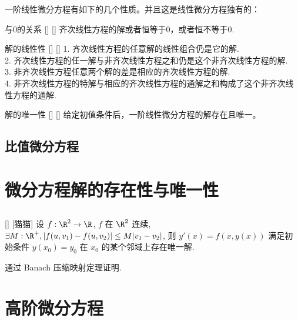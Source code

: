 \documentclass[UTF8]{ctexart}
\begin{document}
        一阶线性微分方程有如下的几个性质。并且这是线性微分方程独有的：
        \begin{ppt}
            []
            {与0的关系}
            []
            []
            齐次线性方程的解或者恒等于0，或者恒不等于0.
        \end{ppt}
        \begin{ppt}
            []
            {解的线性性}
            []
            []
            1. 齐次线性方程的任意解的线性组合仍是它的解.\\
            2. 齐次线性方程的任一解与非齐次线性方程之和仍是这个非齐次线性方程的解.\\
            3. 非齐次线性方程任意两个解的差是相应的齐次线性方程的解.\\
            4. 非齐次线性方程的特解与相应的齐次线性方程的通解之和构成了这个非齐次线性方程的通解.
        \end{ppt}

        \begin{ppt}
            []
            {解的唯一性}
            []
            []
            给定初值条件后，一阶线性微分方程的解存在且唯一。
        \end{ppt}

    \subsection{比值微分方程}

\section{微分方程解的存在性与唯一性}

    \subsection{}
        
        \begin{thm}
            []
            {}
            []
            [猫猫]
            设 \(f:\R^2\to\R\), \(f\) 在 \(\R^2\) 连续, \(\exists M:\R^+, |f(u,v_1)-f(u,v_2)|\leq M|v_1-v_2|\), 则 \(y'(x)=f(x,y(x))\) 满足初始条件 \(y(x_0)=y_0\) 在 \(x_0\) 的某个邻域上存在唯一解. 
        \end{thm}

        \begin{prf}
            通过 Banach 压缩映射定理证明. 
        \end{prf}

\section{高阶微分方程}
\end{document}
